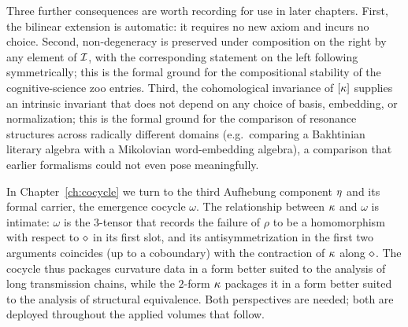 Three further consequences are worth recording for use in later chapters.
First, the bilinear extension is automatic: it requires no new axiom and
incurs no choice. Second, non-degeneracy is preserved under composition
on the right by any element of $\mathcal{I}$, with the corresponding statement
on the left following symmetrically; this is the formal ground for the
compositional stability of the cognitive-science zoo entries. Third, the
cohomological invariance of $[\kappa]$ supplies an intrinsic invariant
that does not depend on any choice of basis, embedding, or normalization;
this is the formal ground for the comparison of resonance structures
across radically different domains (e.g.\ comparing a Bakhtinian
literary algebra with a Mikolovian word-embedding algebra), a comparison
that earlier formalisms could not even pose meaningfully.

In Chapter~\ref{ch:cocycle} we turn to the third Aufhebung component
$\eta$ and its formal carrier, the emergence cocycle $\omega$. The
relationship between $\kappa$ and $\omega$ is intimate: $\omega$ is the
$3$-tensor that records the failure of $\rho$ to be a homomorphism with
respect to $\mathbin{\diamond}$ in its first slot, and its antisymmetrization in
the first two arguments coincides (up to a coboundary) with the
contraction of $\kappa$ along $\mathbin{\diamond}$. The cocycle thus packages
curvature data in a form better suited to the analysis of long
transmission chains, while the $2$-form $\kappa$ packages it in a form
better suited to the analysis of structural equivalence. Both
perspectives are needed; both are deployed throughout the applied
volumes that follow.

